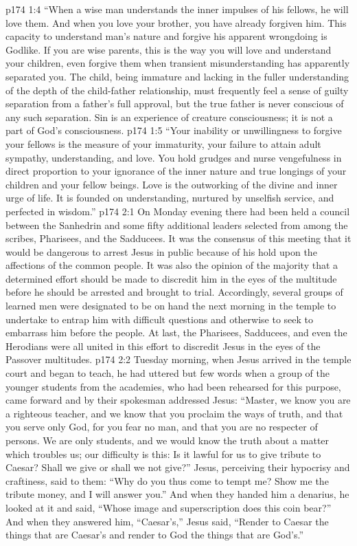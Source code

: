 \vs p174 1:4 \textcolor{ubdarkred}{“When a wise man understands the inner impulses of his fellows, he will love them. And when you love your brother, you have already forgiven him. This capacity to understand man’s nature and forgive his apparent wrongdoing is Godlike. If you are wise parents, this is the way you will love and understand your children, even forgive them when transient misunderstanding has apparently separated you. The child, being immature and lacking in the fuller understanding of the depth of the child\hyp{}father relationship, must frequently feel a sense of guilty separation from a father’s full approval, but the true father is never conscious of any such separation. Sin is an experience of creature consciousness; it is not a part of God’s consciousness.}
\vs p174 1:5 \textcolor{ubdarkred}{“Your inability or unwillingness to forgive your fellows is the measure of your immaturity, your failure to attain adult sympathy, understanding, and love. You hold grudges and nurse vengefulness in direct proportion to your ignorance of the inner nature and true longings of your children and your fellow beings. Love is the outworking of the divine and inner urge of life. It is founded on understanding, nurtured by unselfish service, and perfected in wisdom.”}
\vs p174 2:1 On Monday evening there had been held a council between the Sanhedrin and some fifty additional leaders selected from among the scribes, Pharisees, and the Sadducees. It was the consensus of this meeting that it would be dangerous to arrest Jesus in public because of his hold upon the affections of the common people. It was also the opinion of the majority that a determined effort should be made to discredit him in the eyes of the multitude before he should be arrested and brought to trial. Accordingly, several groups of learned men were designated to be on hand the next morning in the temple to undertake to entrap him with difficult questions and otherwise to seek to embarrass him before the people. At last, the Pharisees, Sadducees, and even the Herodians were all united in this effort to discredit Jesus in the eyes of the Passover multitudes.
\vs p174 2:2 Tuesday morning, when Jesus arrived in the temple court and began to teach, he had uttered but few words when a group of the younger students from the academies, who had been rehearsed for this purpose, came forward and by their spokesman addressed Jesus: “Master, we know you are a righteous teacher, and we know that you proclaim the ways of truth, and that you serve only God, for you fear no man, and that you are no respecter of persons. We are only students, and we would know the truth about a matter which troubles us; our difficulty is this: Is it lawful for us to give tribute to Caesar? Shall we give or shall we not give?” Jesus, perceiving their hypocrisy and craftiness, said to them: \textcolor{ubdarkred}{“Why do you thus come to tempt me? Show me the tribute money, and I will answer you.”} And when they handed him a denarius, he looked at it and said, \textcolor{ubdarkred}{“Whose image and superscription does this coin bear?”} And when they answered him, “Caesar’s,” Jesus said, \textcolor{ubdarkred}{“Render to Caesar the things that are Caesar’s and render to God the things that are God’s.”}
